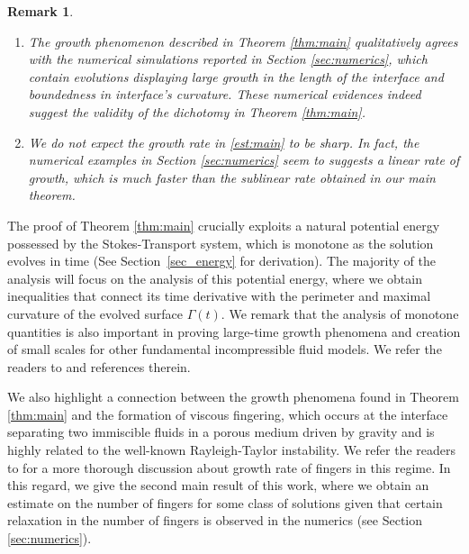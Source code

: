 \documentclass[11pt]{article}
\numberwithin{equation}{section}
\newtheorem{rmk}[thm]{Remark}
\begin{document}
\begin{rmk}
    \begin{enumerate}
        \item The growth phenomenon described in Theorem \ref{thm:main} qualitatively agrees with the numerical simulations reported in Section \ref{sec:numerics}, which contain evolutions displaying large growth in the length of the interface and boundedness in interface's curvature. These numerical evidences indeed suggest the validity of the dichotomy in Theorem \ref{thm:main}. 
        
        \item We do not expect the growth rate in \eqref{est:main} to be sharp. In fact, the numerical examples in Section \ref{sec:numerics} seem to suggests a linear rate of growth, which is much faster than the sublinear rate obtained in our main theorem.
    \end{enumerate}
\end{rmk}

The proof of Theorem \ref{thm:main} crucially exploits a natural potential energy possessed by the Stokes-Transport system, which is monotone as the solution evolves in time (See Section~\ref{sec_energy} for derivation). The majority of the analysis will focus on the analysis of this potential energy, where we obtain inequalities that connect its time derivative with the perimeter and maximal curvature of the evolved surface $\Gamma(t)$. We remark that the analysis of monotone quantities is also important in proving large-time growth phenomena and creation of small scales for other fundamental incompressible fluid models. We refer the readers to \cite{drivas2024twisting,kiselev2024small,kiselev2023small,park2024growth} and references therein.

We also highlight a connection between the growth phenomena found in Theorem \ref{thm:main} and the formation of viscous fingering, which occurs at the interface separating two immiscible fluids in a porous medium driven by gravity and is highly related to the well-known Rayleigh-Taylor instability. We refer the readers to \cite{menon2005dynamic,otto1997viscous} for a more thorough discussion about growth rate of fingers in this regime. In this regard, we give the second main result of this work, where we obtain an estimate on the number of {fingers} for some class of solutions given that certain {relaxation} in the number of {fingers} is observed in the numerics (see Section \ref{sec:numerics}).

\end{document}
